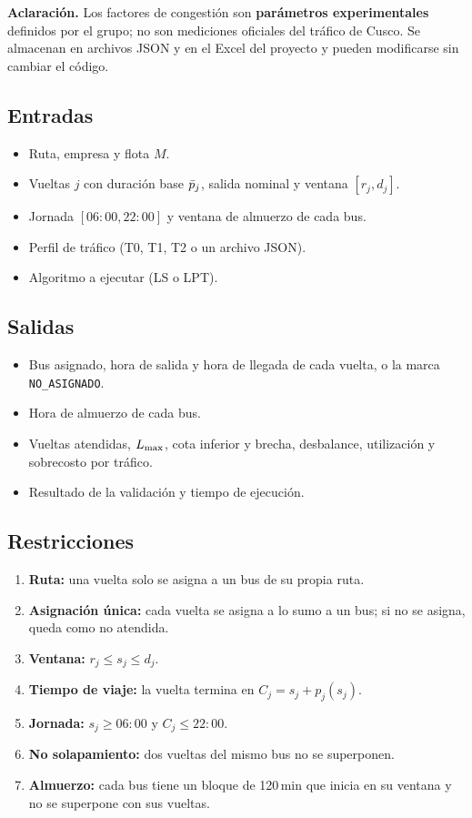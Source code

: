 \begin{nota}
\textbf{\color{guinda}Aclaración.} Los factores de congestión son \textbf{parámetros experimentales} definidos por el grupo; no son mediciones oficiales del tráfico de Cusco. Se almacenan en archivos JSON y en el Excel del proyecto y pueden modificarse sin cambiar el código.
\end{nota}

\subsection{Entradas}
\begin{itemize}
  \item Ruta, empresa y flota $M$.
  \item Vueltas $j$ con duración base $\bar{p}_j$, salida nominal y ventana $[r_j, d_j]$.
  \item Jornada $[06{:}00, 22{:}00]$ y ventana de almuerzo de cada bus.
  \item Perfil de tráfico (T0, T1, T2 o un archivo JSON).
  \item Algoritmo a ejecutar (LS o LPT).
\end{itemize}

\subsection{Salidas}
\begin{itemize}
  \item Bus asignado, hora de salida y hora de llegada de cada vuelta, o la marca \texttt{NO\_ASIGNADO}.
  \item Hora de almuerzo de cada bus.
  \item Vueltas atendidas, $L_{\max}$, cota inferior y brecha, desbalance, utilización y sobrecosto por tráfico.
  \item Resultado de la validación y tiempo de ejecución.
\end{itemize}

\subsection{Restricciones}\label{sec:restricciones}
\begin{enumerate}
  \item \textbf{Ruta:} una vuelta solo se asigna a un bus de su propia ruta.
  \item \textbf{Asignación única:} cada vuelta se asigna a lo sumo a un bus; si no se asigna, queda como no atendida.
  \item \textbf{Ventana:} $r_j \le s_j \le d_j$.
  \item \textbf{Tiempo de viaje:} la vuelta termina en $C_j = s_j + p_j(s_j)$.
  \item \textbf{Jornada:} $s_j \ge 06{:}00$ y $C_j \le 22{:}00$.
  \item \textbf{No solapamiento:} dos vueltas del mismo bus no se superponen.
  \item \textbf{Almuerzo:} cada bus tiene un bloque de 120\,min que inicia en su ventana y no se superpone con sus vueltas.
\end{enumerate}

